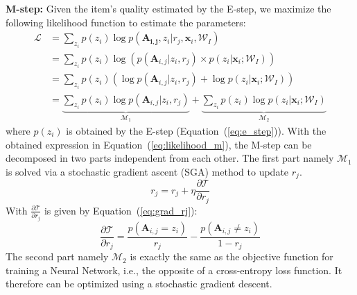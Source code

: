 \noindent\textbf{M-step:}
Given the item's quality estimated by the E-step, we maximize
the following likelihood function to estimate the parameters:
\begin{align}
   \mathcal{L}
    &=\sum_{z_i}p(z_i)\log p(\mathbf{A_{i,j}},z_i|r_j,\mathbf{x}_i,\mathcal{W}_I)\nonumber\\
    &=\sum_{z_i}p(z_i)\log (p(\mathbf{A}_{i,j}| z_i , r_j) \times p(z_i |\mathbf{x}_i;\mathcal{W}_I)) \nonumber\\
    &=\sum_{z_i}p(z_i) (\log p(\mathbf{A}_{i,j}| z_i , r_j)+\log p(z_i |\mathbf{x}_i;\mathcal{W}_I)) \nonumber\\
    &=\underbrace{\sum_{z_i}p(z_i) \log p(\mathbf{A}_{i,j}| z_i , r_j)}_{\mathcal{M}_1}
    +\underbrace{\sum_{z_i}p(z_i)\log p(z_i |\mathbf{x}_i;\mathcal{W}_I)}_{\mathcal{M}_2}
    \label{eq:likelihood_m}
\end{align}
where $p(z_i)$ is obtained by the E-step (Equation~(\ref{eq:e_step})). With the obtained expression in 
Equation~(\ref{eq:likelihood_m}), the M-step can be decomposed in two parts independent from each other.
The first part namely $\mathcal{M}_1$ is solved via a stochastic gradient
ascent (SGA) method to update $r_j$.
\begin{equation}
    r_j=r_j+\eta \frac{\partial \mathcal{T}}{\partial r_j}
    \label{eq:m_rj}
\end{equation}
With $\frac{\partial \mathcal{T}}{\partial r_j}$ is given by Equation~(\ref{eq:grad_rj}):
\begin{equation}
    \frac{\partial \mathcal{T}}{\partial r_j}=\frac{p(\mathbf{A}_{i,j}=z_i)}{r_j}-\frac{p(\mathbf{A}_{i,j}\neq z_i)}{1-r_j}
    \label{eq:grad_rj}
\end{equation}
The second part namely $\mathcal{M}_2$  is exactly the same as the objective function for 
training a Neural Network, i.e., the opposite of a cross-entropy loss function. 
It therefore can be optimized using a stochastic gradient descent.

